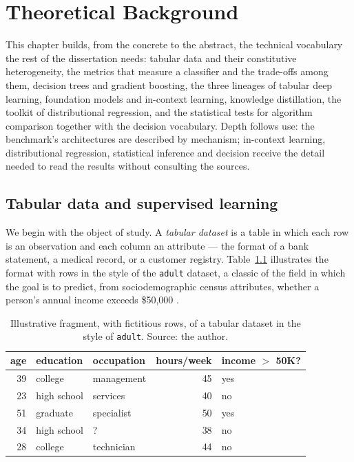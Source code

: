 \chapter{Theoretical Background}
\label{chap:fundamentacao}

This chapter builds, from the concrete to the abstract, the technical
vocabulary the rest of the dissertation needs: tabular data and their
constitutive heterogeneity, the metrics that measure a classifier and
the trade-offs among them, decision trees and gradient boosting, the
three lineages of tabular deep learning, foundation models and
in-context learning, knowledge distillation, the toolkit of
distributional regression, and the statistical tests for algorithm
comparison together with the decision vocabulary. Depth follows use:
the benchmark's architectures are described by mechanism; in-context
learning, distributional regression, statistical inference and
decision receive the detail needed to read the results without
consulting the sources.

\section{Tabular data and supervised learning}
\label{sec:fund-tabular}

We begin with the object of study. A \emph{tabular dataset} is a table in
which each row is an observation and each column an attribute --- the
format of a bank statement, a medical record, or a customer registry.
Table~\ref{tab:adult-exemplo} illustrates the format with rows in the
style of the \texttt{adult} dataset, a classic of the field in which
the goal is to predict, from sociodemographic census attributes,
whether a person's annual income exceeds \$50{,}000
\citep{kohavi1996}.

\begin{table}[htb]
\centering
\caption[Illustrative fragment of a tabular dataset]{Illustrative
fragment, with fictitious rows, of a tabular dataset in the style of
\texttt{adult}. Source: the author.}
\label{tab:adult-exemplo}
\begin{tabular}{rllrl}
\toprule
age & education & occupation & hours/week & income $>$ 50K? \\
\midrule
39 & college       & management  & 45 & yes \\
23 & high school   & services    & 40 & no \\
51 & graduate      & specialist  & 50 & yes \\
34 & high school   & ?           & 38 & no \\
28 & college       & technician  & 44 & no \\
\bottomrule
\end{tabular}
\end{table}

